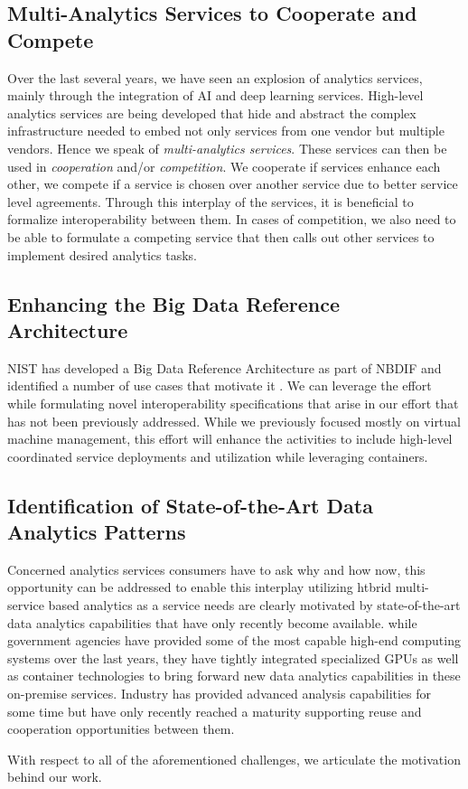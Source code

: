 \subsection{Multi-Analytics Services to Cooperate and Compete}

Over the last several years, we have seen an explosion of analytics
services, mainly through the integration of AI and deep learning
services. High-level analytics services are being developed that hide
and abstract the complex infrastructure needed to embed not only
services from one vendor but multiple vendors. Hence we speak of {\em
multi-analytics services}. These services can then be used in {\em
cooperation} and/or {\em competition}. We cooperate if services
enhance each other, we compete if a service is chosen over another
service due to better service level agreements. Through this interplay
of the services, it is beneficial to formalize interoperability
between them. In cases of competition, we also need to be able to
formulate a competing service that then calls out other services to
implement desired analytics tasks.

\subsection{Enhancing the Big Data Reference Architecture}
\label{s:arch}

NIST has developed a Big Data Reference Architecture as part of
NBDIF\cite{nist-v6} and identified a number of use cases that motivate
it \cite{nist-v3}. We can leverage the effort
~\cite{nist-v1,nist-v2,nist-v3,nist-v4,nist-v5,nist-v6,nist-v7,nist-v8,nist-v9}
while formulating novel interoperability specifications that arise in
our effort that has not been previously addressed. While we previously focused
mostly on virtual machine management, this effort will enhance the
activities to include high-level coordinated service deployments and
utilization while leveraging containers.

\subsection{Identification of State-of-the-Art Data Analytics Patterns}

Concerned analytics services consumers have to ask why and how now,
this opportunity can be addressed to enable this interplay utilizing
htbrid multi-service based analytics as a service needs are clearly
motivated by state-of-the-art data analytics capabilities that have
only recently become available.  while government agencies have
provided some of the most capable high-end computing systems over the
last years, they have tightly integrated specialized GPUs as well as
container technologies to bring forward new data analytics
capabilities in these on-premise services. Industry has provided
advanced analysis capabilities for some time but have only recently
reached a maturity supporting reuse and cooperation opportunities
between them.

With respect to all of the aforementioned challenges, we articulate 
the motivation behind our work. 


